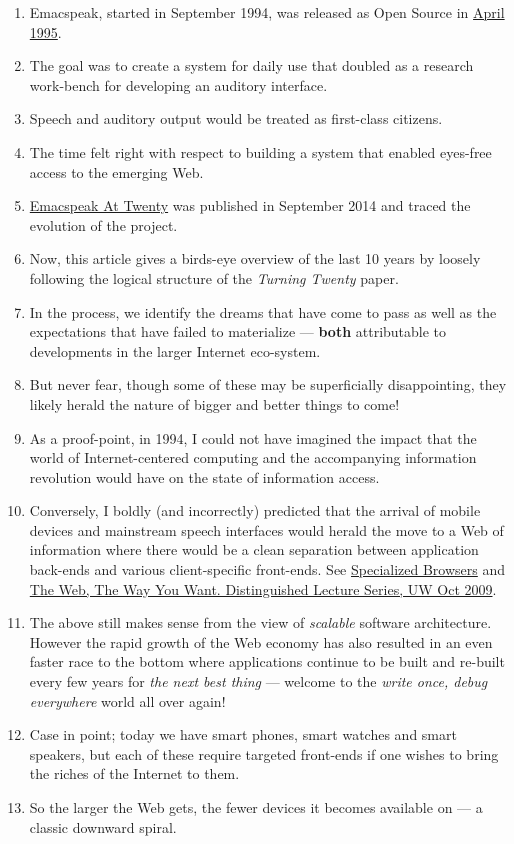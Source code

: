 \documentclass[11pt]{article}
\begin{document}
\begin{enumerate}
\item Emacspeak, started in September 1994, was released as Open
Source in \href{https://tvraman.github.io/emacspeak//web/releases/release-3.0.html}{April 1995}.
\item The goal was to create a system for daily use that  doubled
as a research work-bench for developing an auditory interface.
\item Speech and auditory output would be  treated as 
first-class citizens.
\item The time felt right with respect to building a  system 
that enabled  eyes-free access to the emerging Web.
\item \href{https://emacspeak.sourceforge.net/turning-twenty.html}{Emacspeak At Twenty}  was published in September 2014 and  traced the
evolution of the project.
\item Now, this article gives a birds-eye overview of the last 10 years
by loosely following the logical structure of the  \emph{Turning Twenty} paper.
\item In the process, we identify the dreams that have come to pass as
well as the expectations that have failed to materialize --- \textbf{both}
attributable  to developments in the larger Internet eco-system.
\item But never fear, though  some of these
may be   superficially
disappointing, they likely herald the nature of bigger and better
things to come!
\item As a proof-point, in 1994, I could not have imagined the impact
that the world of Internet-centered  computing and the accompanying
information revolution would have  on the state of information
access.
\item Conversely, I boldly (and incorrectly) predicted that the
arrival of mobile devices and mainstream speech interfaces would
herald the move to a Web of information where there would be a
clean separation between application back-ends and various
client-specific front-ends. See \href{https://emacspeak.sourceforge.net/raman/publications/specialized-browsers/}{Specialized Browsers} and \href{http://www.cs.washington.edu/htbin-post/mvis/mvis?ID=636}{The
Web, The Way You Want.  Distinguished Lecture Series, UW Oct
2009}.
\item The above still makes sense from the view of  \emph{scalable} software architecture. However the rapid growth of the Web economy has also
resulted in an even faster race to the bottom where applications
continue to be built and re-built every few years for \emph{the next
best thing} --- welcome to the \emph{write once, debug everywhere}
world all over again!
\item Case in point; today we have smart phones, smart watches  and smart speakers,
but each of these  require targeted front-ends  
if one wishes to  bring the riches of the Internet to them.
\item So the larger the Web gets, the fewer devices it becomes
available  on --- a classic downward spiral.
\end{enumerate}
\end{document}
